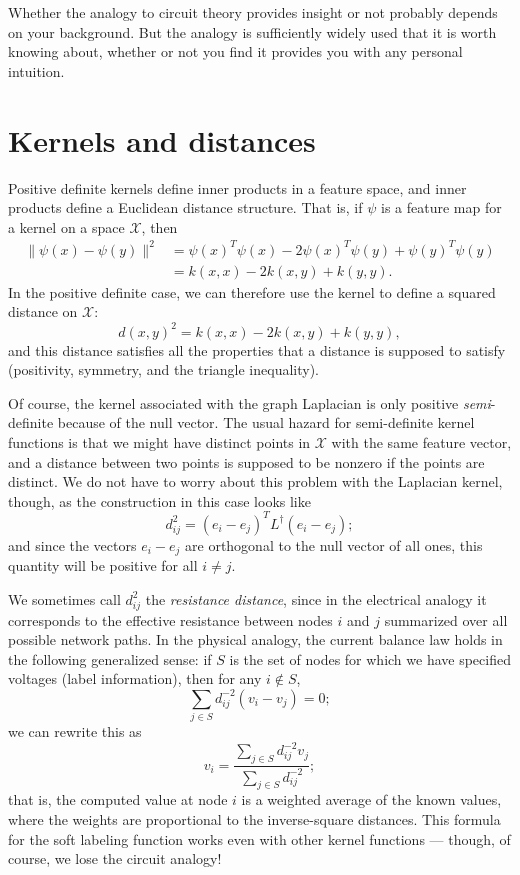 \documentclass[12pt, leqno]{article} %
\begin{document}
Whether the analogy to circuit theory provides insight or not probably
depends on your background.  But the analogy is sufficiently widely
used that it is worth knowing about, whether or not you find it
provides you with any personal intuition.

\section{Kernels and distances}

Positive definite kernels define inner products in a feature space,
and inner products define a Euclidean distance structure.  That is, if
$\psi$ is a feature map for a kernel on a space $\mathcal{X}$, then
\begin{align*}
  \|\psi(x)-\psi(y)\|^2
  &= \psi(x)^T \psi(x) - 2 \psi(x)^T \psi(y) + \psi(y)^T \psi(y) \\
  & = k(x,x) - 2 k(x,y) + k(y,y).
\end{align*}
In the positive definite case, we can therefore use the kernel to
define a squared distance on $\mathcal{X}$:
\[
  d(x,y)^2 = k(x,x) - 2 k(x,y) + k(y,y),
\]
and this distance satisfies all the properties that a distance is supposed
to satisfy (positivity, symmetry, and the triangle inequality).

Of course, the kernel associated with the graph Laplacian is only
positive {\em semi}-definite because of the null vector.  The usual
hazard for semi-definite kernel functions is that we might have
distinct points in $\mathcal{X}$ with the same feature vector, and a
distance between two points is supposed to be nonzero if the points
are distinct.  We do not have to worry about this problem with the
Laplacian kernel, though, as the construction in this case looks like
\[
  d_{ij}^2 = (e_i-e_j)^T L^\dagger (e_i-e_j);
\]
and since the vectors $e_i-e_j$ are orthogonal to the null vector of
all ones, this quantity will be positive for all $i \neq j$.

We sometimes call $d_{ij}^2$ the {\em resistance distance}, since in the
electrical analogy it corresponds to the effective resistance between
nodes $i$ and $j$ summarized over all possible network paths.
In the physical analogy, the current balance law holds in the
following generalized sense: if $S$ is the set of nodes for which we
have specified voltages (label information), then for any $i \not \in S$,
\[
  \sum_{j \in S} d_{ij}^{-2} (v_i-v_j) = 0;
\]
we can rewrite this as
\[
  v_i = \frac{\sum_{j \in S} d_{ij}^{-2} v_j}{\sum_{j \in S} d_{ij}^{-2}};
\]
that is, the computed value at node $i$ is a weighted average of the
known values, where the weights are proportional to the inverse-square
distances.  This formula for the soft labeling function works even
with other kernel functions --- though, of course, we lose the circuit
analogy!
\end{document}

